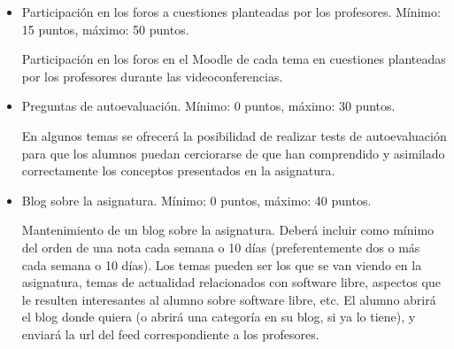 \documentclass[a4paper,12pt]{article}
\begin{document}
\begin{itemize}
\item Participación en los foros a cuestiones planteadas por los profesores. Mínimo: 15 puntos, máximo: 50 puntos.

Participación en los foros en el Moodle de cada tema en cuestiones planteadas por los profesores durante las videoconferencias.

\item Preguntas de autoevaluación. Mínimo: 0 puntos, máximo: 30 puntos.

En algunos temas se ofrecerá la posibilidad de realizar tests de autoevaluación para que los alumnos puedan cerciorarse de que han comprendido y asimilado correctamente los conceptos presentados en la asignatura.

\item Blog sobre la asignatura. Mínimo: 0 puntos, máximo: 40 puntos.

Mantenimiento de un blog sobre la asignatura. Deberá incluir como mínimo del orden de una nota cada semana o 10 días (preferentemente dos o más cada semana o 10 días). Los temas pueden ser los que se van viendo en la asignatura, temas de actualidad relacionados con software libre, aspectos que le resulten interesantes al alumno sobre software libre, etc. El alumno abrirá el blog donde quiera (o abrirá una categoría en su blog, si ya lo tiene), y enviará la url del feed correspondiente a los profesores.







\end{itemize}
\end{document}
